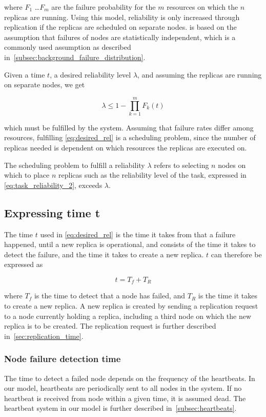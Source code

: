 \documentclass{cslthse-msc}
\begin{document}
where $F_1$ \dots $F_m$ are the failure probability for the $m$ resources on which the $n$ replicas are running. Using this model, reliability is only increased through replication if the replicas are scheduled on separate nodes.  is based on the assumption that failures of nodes are statistically independent, which is a commonly used assumption as described in~\cref{subsec:background_failure_distribution}.

Given a time $t$, a desired reliability level $\lambda$, and assuming the replicas are running on separate nodes, we get

\begin{equation} \label{eq:desired_rel}
\lambda \leq 1 - \prod\limits_{k=1}^m F_{k}(t)
\end{equation}

which must be fulfilled by the system. Assuming that failure rates differ among resources, fulfilling \cref{eq:desired_rel} is a scheduling problem, since the number of replicas needed is dependent on which resources the replicas are executed on.

The scheduling problem to fulfill a reliability $\lambda$ refers to selecting $n$ nodes on which to place $n$ replicas such as the reliability level of the task, expressed in \cref{eq:task_reliability_2}, exceeds $\lambda$.

\subsection{Expressing time t} \label{sec:design_time_t}
The time $t$ used in \cref{eq:desired_rel} is the time it takes from that a failure happened, until a new replica is operational, and consists of the time it takes to detect the failure, and the time it takes to create a new replica. $t$ can therefore be expressed as 

\begin{equation} \label{eq:rep_time}
	t = T_f + T_R
\end{equation}

where $T_f$ is the time to detect that a node has failed, and $T_R$ is the time it takes to create a new replica. A new replica is created by sending a replication request to a node currently holding a replica, including a third node on which the new replica is to be created. The replication request is further described in~\cref{sec:replication_time}.

\subsubsection{Node failure detection time} \label{sec:node_failure_detection_time}
The time to detect a failed node depends on the frequency of the heartbeats. In our model, heartbeats are periodically sent to all nodes in the system. If no heartbeat is received from node within a given time, it is assumed dead. The heartbeat system in our model is further described in~\cref{subsec:heartbeats}.
\end{document}
